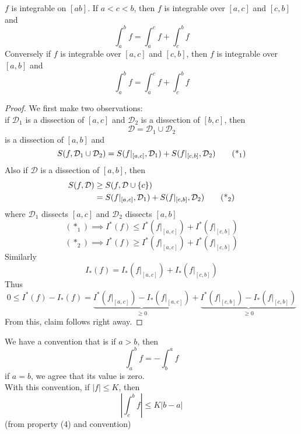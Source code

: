 \begin{claim}[6]
$f$ is integrable on $[ab]$. If $a<c<b$, then $f$ is integrable over $[a,c]$ and $[c,b]$ and
\[\int_a^b f = \int_a^c f + \int_c^b f\]
Conversely if $f$ is integrable over $[a,c]$ and $[c,b]$, then $f$ is integrable over $[a,b]$ and
\[\int_a^b f = \int_a^c f + \int_c^b f\]
\begin{proof}
We first make two observations:\\
if $\mathcal{D}_1$ is a dissection of $[a,c]$ and $\mathcal{D}_2$ is a dissection of $[b,c]$, then
\[\mathcal{D} = \mathcal{D}_1 \cup \mathcal{D}_2\]
is a dissection of $[a,b]$ and
\[S(f,\mathcal{D}_1\cup\mathcal{D}_2) = S(f|_{[a,c]},\mathcal{D}_1) + S(f|_{[c,b]},\mathcal{D}_2) \tag{$\text{*}_1$}\]
Also if $\mathcal{D}$ is a dissection of $[a,b]$, then
\begin{align*}
    S(f,\mathcal{D})&\geq S(f,\mathcal{D}\cup \{c\})\\
    &=S(f|_{[a,c]},\mathcal{D}_1) + S(f|_{[c,b]},\mathcal{D}_2) \tag{$\text{*}_2$}
\end{align*}
where $\mathcal{D}_1$ dissects $[a,c]$ and $\mathcal{D}_2$ dissects $[a,b]$
\[(*_1)\implies I^{*}(f) \leq I^*(f|_{[a,c]}) + I^*(f|_{[c,b]})\]
\[(*_2)\implies I^{*}(f) \geq I^*(f|_{[a,c]}) + I^*(f|_{[c,b]})\]
Similarly
\[I_*(f) = I_*(f|_{[a,c]}) + I_*(f|_{[c,b]})\]
Thus
\[0\leq I^*(f) - I_*(f) = \underbrace{I^*(f|_{[a,c]}) - I_*(f|_{[a,c]})}_{\geq 0} + \underbrace{I^*(f|_{[c,b]}) - I_*(f|_{[c,b]})}_{\geq 0}\]
From this, claim follows right away.
\end{proof}
\end{claim}
\begin{notation}
We have a convention that is if $a>b$, then
\[\int_a^b f = -\int_b^a f\]
if $a=b$, we agree that its value is zero.\\
With this convention, if $|f|\leq K$, then
\[\left|\int_c^b f\right|\leq K|b-a|\]
(from property (4) and convention)
\end{notation}
